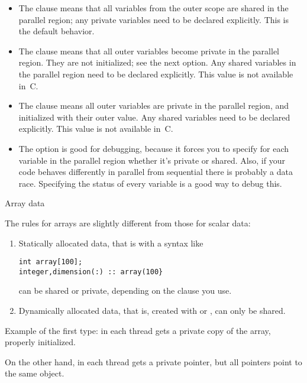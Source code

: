 \begin{itemize}
\item The  clause means that all
  variables from the outer scope are shared in the parallel region; any private variables
  need to be declared explicitly. This is the default behavior.
\item The  clause means that all
  outer variables become private in the parallel region. They are not
  initialized; see the next option. Any shared variables in the
  parallel region
  need to be declared explicitly. This value is not available in~C.
\item The  clause means all
  outer variables are private in the parallel region, and initialized
  with their outer value.  Any shared variables
  need to be declared explicitly. This value is not available in~C.
\item The  option is good for debugging, 
  because it forces you to specify for each variable in the parallel region
  whether it's private or shared. Also,
  if your code
behaves differently in parallel from sequential there is probably a data race.
Specifying the status of every variable is a good way to
debug this.
\end{itemize}

 {Array data}
\label{sec:omp-array}

The rules for arrays are slightly different from those for scalar data:
\begin{enumerate}
\item Statically allocated data, that is with a syntax like
\begin{lstlisting}
int array[100];
integer,dimension(:) :: array(100}
\end{lstlisting}
can be shared or private, depending on the clause you use.
\item Dynamically allocated data, that is, created with
   or
  , can only be shared.
\end{enumerate}
Example of the first type: in
%
%
each thread gets a private copy of the array, properly initialized.

On the other hand, in
%
%
each thread gets a private pointer, but all pointers point to the same
object.

